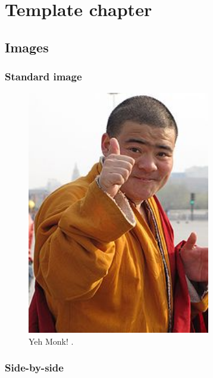\chapter{Template chapter}

\label{ChapterTemplate} %

\section{Images}

\subsection{Standard image}

\begin{figure}[H]
\centering
\includegraphics[width=8cm]{Figures/yeh_monk.jpg}
\decoRule
\caption[img-name]{Yeh Monk! \parencite{cf_1.2_eigentaste}.}
\label{fig:monkeh}
\end{figure}

\subsection{Side-by-side}

